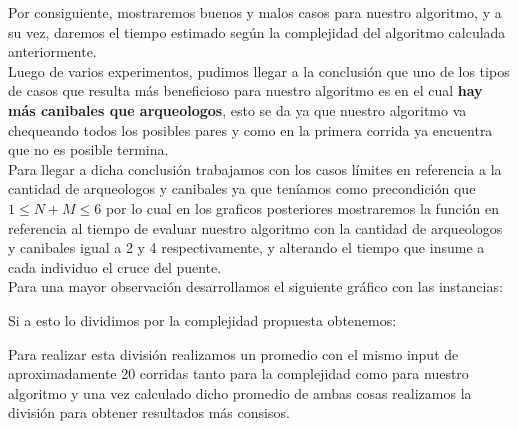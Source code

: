 \indent Por consiguiente, mostraremos buenos y malos casos para nuestro algoritmo, y a su vez, daremos el tiempo estimado 
seg\'un la complejidad del algoritmo calculada anteriormente.\\

Luego de varios experimentos, pudimos llegar a la conclusi\'on que uno de los tipos de casos que resulta m\'as beneficioso para nuestro algoritmo
es en el cual \textbf{hay m\'as canibales que arqueologos}, esto se da ya que nuestro algoritmo va chequeando todos los posibles pares y como en la primera corrida ya encuentra que no es posible termina.\\

Para llegar a dicha conclusi\'on trabajamos con los casos l\'imites en referencia a la cantidad de arqueologos y canibales ya que ten\'iamos como precondici\'on que $1 \leq N + M \leq 6$ por lo cual en los graficos posteriores mostraremos la funci\'on en referencia al tiempo de evaluar nuestro algoritmo con la cantidad de arqueologos y canibales igual a 2 y 4 respectivamente, y alterando el tiempo que insume a cada individuo el cruce del puente.\\

Para una mayor observaci\'on desarrollamos el siguiente gr\'afico con las instancias:\\

\vspace*{0.3cm} \vspace*{0.3cm}
  \begin{center}
  \end{center}
  \vspace*{0.3cm}


Si a esto lo dividimos por la complejidad propuesta obtenemos:\\

\vspace*{0.3cm} \vspace*{0.3cm}
  \begin{center}
  \end{center}
  \vspace*{0.3cm}

 Para realizar esta divisi\'on realizamos un promedio con el mismo input de aproximadamente 20 corridas tanto para la complejidad como para nuestro algoritmo y una vez calculado dicho promedio de ambas cosas realizamos la divisi\'on para
obtener resultados m\'as consisos.\\ 

